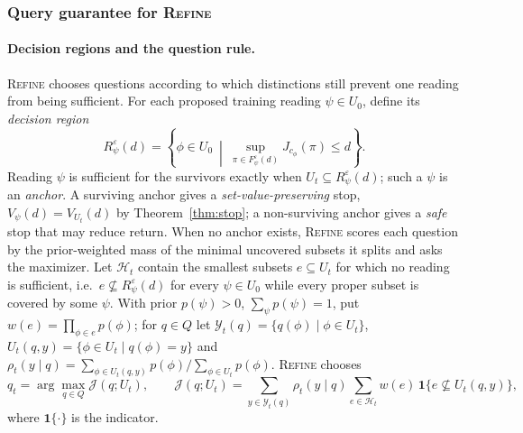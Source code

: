 \subsubsection*{Query guarantee for \textsc{Refine}}

\paragraph{Decision regions and the question rule.}
\textsc{Refine} chooses questions according to which distinctions still prevent one
reading from being sufficient. For each proposed training reading \(\psi\in U_0\),
define its \emph{decision region}
\begin{equation}
R^\varepsilon_\psi(d)
=\left\{\phi\in U_0\ \middle|\ \sup_{\pi\in F^\varepsilon_\psi(d)}J_{c_\phi}(\pi)\leq d\right\}.
\label{eq:region}
\end{equation}
Reading \(\psi\) is sufficient for the survivors exactly when \(U_t\subseteq R^\varepsilon_\psi(d)\);
such a \(\psi\) is an \emph{anchor}. A surviving anchor gives a \emph{set-value-preserving}
stop, \(V_\psi(d)=V_{U_t}(d)\) by Theorem~\ref{thm:stop}; a non-surviving anchor gives a
\emph{safe} stop that may reduce return. When no anchor exists, \textsc{Refine} scores each
question by the prior-weighted mass of the minimal uncovered subsets it splits and asks the
maximizer. Let \(\mathcal H_t\) contain the smallest subsets \(e\subseteq U_t\) for which no
reading is sufficient, i.e.\ \(e\nsubseteq R^\varepsilon_\psi(d)\) for every
\(\psi\in U_0\) while every proper subset is covered by some \(\psi\). With prior
\(p(\psi)>0\), \(\sum_\psi p(\psi)=1\), put \(w(e)=\prod_{\phi\in e}p(\phi)\); for
\(q\in Q\) let \(\mathcal Y_t(q)=\{q(\phi)\mid\phi\in U_t\}\),
\(U_t(q,y)=\{\phi\in U_t\mid q(\phi)=y\}\) and
\(\rho_t(y\mid q)=\sum_{\phi\in U_t(q,y)}p(\phi)\big/\sum_{\phi\in U_t}p(\phi)\).
\textsc{Refine} chooses
\begin{equation}
q_t=\arg\max_{q\in Q}\mathcal J(q;U_t),
\qquad
\mathcal J(q;U_t)=\sum_{y\in\mathcal Y_t(q)}\rho_t(y\mid q)
\sum_{e\in\mathcal H_t}w(e)\,\mathbf 1\{e\nsubseteq U_t(q,y)\},
\label{eq:question}
\end{equation}
where \(\mathbf 1\{\cdot\}\) is the indicator.

